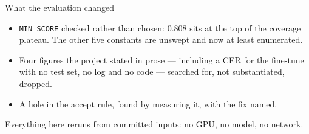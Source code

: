 \documentclass[aspectratio=169]{beamer}
\begin{document}
\begin{frame}{What the evaluation changed}
  \begin{itemize}
    \item \texttt{MIN\_SCORE} checked rather than chosen: 0.808 sits at the
      top of the coverage plateau. The other five constants are unswept and
      now at least enumerated.
    \item Four figures the project stated in prose --- including a CER for
      the fine-tune with no test set, no log and no code --- searched for,
      not substantiated, dropped.
    \item A hole in the accept rule, found by measuring it, with the fix
      named.
  \end{itemize}
  \vfill
  Everything here reruns from committed inputs: no GPU, no model, no network.
\end{frame}
\end{document}
